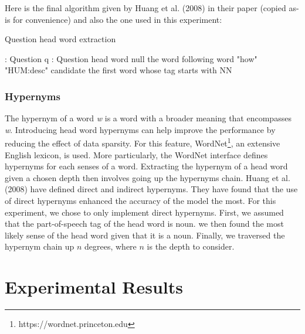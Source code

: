 \documentclass[11pt]{article}
\begin{document}
Here is the final algorithm given by Huang et al. (2008) in their paper (copied as-is for convenience) and also the one used in this experiment:

\begin{algorithm}
\caption{Question head word extraction}
\label{HWExtraction}
\begin{algorithmic}[1]
\Require: Question q
\Ensure: Question head word
	\State \Return null
\EndIf
{}
	\State \Return the word following word "how"
\EndIf
{}
\EndIf
{}
	\State \Return "HUM:desc"
\EndIf
{}
  \State \Return candidate
\EndIf
\Return the first word whose tag starts with NN
\end{algorithmic}
\end{algorithm}

\subsubsection{Hypernyms} The hypernym of a word \textit{w} is a word with a broader meaning that encompasses \textit{w}. Introducing head word hypernyms can help improve the performance by reducing the effect of data sparsity. For this feature, WordNet\footnote{https://wordnet.princeton.edu}, an extensive English lexicon, is used. More particularly, the WordNet interface defines hypernyms for each senses of a word. Extracting the hypernym of a head word given a chosen depth then involves going up the hypernyms chain. Huang et al. (2008) have defined direct and indirect hypernyms. They have found that the use of direct hypernyms enhanced the accuracy of the model the most. For this experiment, we chose to only implement direct hypernyms. First, we assumed that the part-of-speech tag of the head word is noun. we then found the most likely sense of the head word given that it is a noun.  Finally, we traversed the hypernym chain up $n$ degrees, where $n$ is the depth to consider.

\section{Experimental Results}
\end{document}
